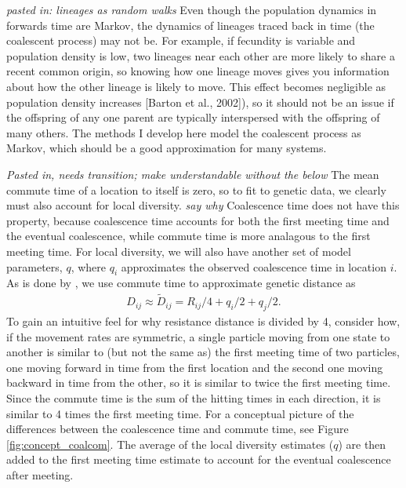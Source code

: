 \documentclass{article}
\newcommand{\Dcom}{\widetilde D}
\newcommand{\plr}[1]{{\em \color{blue} #1}}
\begin{document}
\plr{pasted in: lineages as random walks}
Even though the population dynamics in forwards time are Markov, the dynamics of lineages traced back
in time (the coalescent process) may not be. For example, if fecundity is variable and population density
is low, two lineages near each other are more likely to share a recent common origin, so knowing how one
lineage moves gives you information about how the other lineage is likely to move. This effect becomes
negligible as population density increases [Barton et al., 2002]), so it should not be an issue if the offspring
of any one parent are typically interspersed with the offspring of many others. The methods I develop here
model the coalescent process as Markov, which should be a good approximation for many systems.

\plr{Pasted in, needs transition; make understandable without the below}
The mean commute time of a location to itself is zero,
so to fit to genetic data, we clearly must also account for local diversity.
\plr{say why}
Coalescence time does not have this property,
because coalescence time accounts for both the first meeting time and the eventual coalescence,
while commute time is more analagous to the first meeting time.
For local diversity, we will also have another set of model parameters, $q$, 
where $q_{i}$ approximates the observed coalescence time in location $i$.
As is done by \citet{petkova2016visualizing},
we use commute time to approximate genetic distance as
\begin{align} \label{eq:hcom}
	D_{ij} \approx \Dcom_{ij} = R_{ij}/4 + q_{i}/2 + q_{j}/2 .
\end{align}
To gain an intuitive feel for why resistance distance is divided by 4, 
consider how, if the movement rates are symmetric, 
a single particle moving from one state to another is similar to (but not the same as)
the first meeting time of two particles, 
one moving forward in time from the first location 
and the second one moving backward in time from the other, 
so it is similar to twice the first meeting time.
Since the commute time is the sum of the hitting times in each direction, 
it is similar to 4 times the first meeting time.
For a conceptual picture of the differences between the coalescence time and commute time,
see Figure \ref{fig:concept_coalcom}. 
The average of the local diversity estimates ($q$) are then added 
to the first meeting time estimate to account for the eventual coalescence after meeting.
\end{document}
